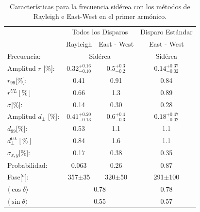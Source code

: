     \begin{table}[H]
        \begin{small}
            \begin{center}
                \begin{tabular}[c]{l|c|c||c|}
                    \cline{2-4}               &  \multicolumn{2}{c||}{Todos los Disparos}                  & Disparo Estándar      \\
                    \cline{2-4}               & Rayleigh                      & East - West                 & East - West\cite{Aab_2020}      \\\hline
\multicolumn{1}{|l|}{Frecuencia:             }& \multicolumn{2}{c||}{Sidérea}                               & Sidérea        \\ \hline
\multicolumn{1}{|l|}{Amplitud $r$ [\%]:      }& $0.32^{+0.16}_{-0.10}$ 	      & $0.5^{+0.3}_{-0.2}$         & $0.14^{+0.37}_{-0.02}$\cite{codigo}       \\
\multicolumn{1}{|l|}{$r_{99}$[\%]:           }& 0.41	                      & 0.91                        & 0.84\cite{codigo}        \\
\multicolumn{1}{|l|}{$r^{UL}[\%]$      }      & 0.66                          & 1.3                         & 0.89 \cite{codigo}        \\
\multicolumn{1}{|l|}{$\sigma$[\%]:     }      & 0.14                          & 0.30	                    & 0.28 \cite{codigo}          \\ \hline
\multicolumn{1}{|l|}{Amplitud $d_\perp$ [\%]:}& $0.41^{+0.20}_{-0.13}$        & $0.6^{+0.4}_{-0.3}$         & $0.18^{+0.47}_{-0.02}$       \\ 
\multicolumn{1}{|l|}{$d_{99}$[\%]:           }& 0.53	                      & 1.1                         & 1.1\cite{codigo}        \\
\multicolumn{1}{|l|}{$d_{\perp}^{UL}[\%]$    }& 0.84                          & 1.6                         & 1.1        \\
\multicolumn{1}{|l|}{$\sigma_{x,y}$[\%]:     }& 0.17                          & 0.38	                    & 0.35          \\ \hline
\multicolumn{1}{|l|}{Probabilidad:           }& 0.063	                      & 0.26                        & 0.87          \\
\multicolumn{1}{|l|}{Fase[$^o$]:             }& 357$\pm$35                    & 320$\pm$50                 & 291$\pm$100      \\\hline
\multicolumn{1}{|l|}{$\langle\cos\delta\rangle$} & \multicolumn{2}{c||}{0.78}                              & 0.78       \\        
\multicolumn{1}{|l|}{$\langle\sin\theta\rangle$} & \multicolumn{2}{c||}{0.55}                              & 0.57       \\ \hline       
\end{tabular}
            \end{center}
        \end{small}
        \caption{Características para la frecuencia sidérea con los métodos de Rayleigh  e East-West en el primer armónico.}
        \label{tab:siderea_3}
    \end{table}
   

